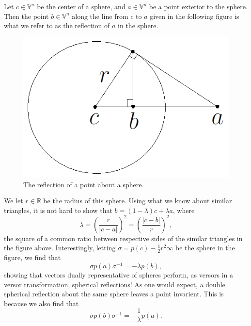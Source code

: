 \documentclass[12pt]{article}
\newcommand{\V}{\mathbb{V}}
\newcommand{\R}{\mathbb{R}}
\newcommand{\nvai}{\infty}
\begin{document}
Let $c\in\V^n$ be the center of a sphere, and $a\in\V^n$ be a point
exterior to the sphere.  Then the point $b\in\V^n$ along the line
from $c$ to $a$ given in the following figure is what we refer to
as the reflection of $a$ in the sphere.
\begin{figure}[H]\label{fig_spherical_reflection}
\centering
\includegraphics[scale=0.3]{SphericalReflectionFigure}
\caption{The reflection of a point about a sphere.}
\end{figure}
We let $r\in\R$ be the radius of this sphere.  Using what we know about similar
triangles, it is not hard to show that $b = (1-\lambda)c + \lambda a$,
where
\begin{equation*}
\lambda = \left(\frac{r}{|c-a|}\right)^2 = \left(\frac{|c-b|}{r}\right)^2,
\end{equation*}
the square of a common ratio between respective sides of the
similar triangles in the figure above.
Interestingly, letting $\sigma=p(c)-\frac{1}{2}r^2\nvai$ be the sphere in the figure, we find that
\begin{equation*}
\sigma p(a)\sigma^{-1} = -\lambda p(b),
\end{equation*}
showing that vectors dually
representative of spheres perform, as versors in a versor transformation, spherical reflections!
As one would expect, a double spherical reflection about the same sphere leaves a point
invarient.  This is because we also find that
\begin{equation*}
\sigma p(b)\sigma^{-1} = -\frac{1}{\lambda}p(a).
\end{equation*}
\end{document}

